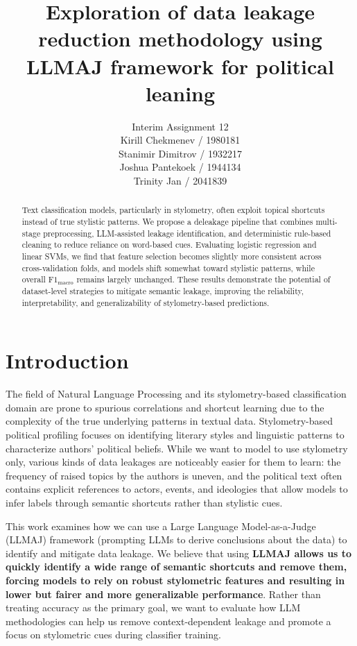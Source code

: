 \documentclass[11pt]{article}
\title{Exploration of data leakage reduction methodology using LLMAJ framework for political leaning}
\author{Interim Assignment 12 \\
  Kirill Chekmenev / 1980181 \\
  Stanimir Dimitrov / 1932217 \\
  Joshua Pantekoek / 1944134 \\
  Trinity Jan / 2041839 \\}
\begin{document}
\maketitle
\begin{abstract}
    Text classification models, particularly in stylometry, often exploit topical shortcuts instead of true stylistic patterns. We propose a deleakage pipeline that combines multi-stage preprocessing, LLM-assisted leakage identification, and deterministic rule-based cleaning to reduce reliance on word-based cues. Evaluating logistic regression and linear SVMs, we find that feature selection becomes slightly more consistent across cross-validation folds, and models shift somewhat toward stylistic patterns, while overall $\mathrm{F1}_{\text{macro}}$ remains largely unchanged. These results demonstrate the potential of dataset-level strategies to mitigate semantic leakage, improving the reliability, interpretability, and generalizability of stylometry-based predictions.
\end{abstract}

\section{Introduction}
The field of Natural Language Processing and its stylometry-based classification domain are prone to spurious correlations and shortcut learning due to the complexity of the true underlying patterns in textual data. Stylometry-based political profiling focuses on identifying literary styles and linguistic patterns to characterize authors’ political beliefs. While we want to model to use stylometry only, various kinds of data leakages are noticeably easier for them to learn: the frequency of raised topics by the authors is uneven, and the political text often contains explicit references to actors, events, and ideologies that allow models to infer labels through semantic shortcuts rather than stylistic cues.


This work examines how we can use a Large Language Model-as-a-Judge (LLMAJ) framework (prompting LLMs to derive conclusions about the data) to identify and mitigate data leakage. We believe that using \textbf{LLMAJ allows us to quickly identify a wide range of semantic shortcuts and remove them, forcing models to rely on robust stylometric features and resulting in lower but fairer and more generalizable performance}. Rather than treating accuracy as the primary goal, we want to evaluate how LLM methodologies can help us remove context-dependent leakage and promote a focus on stylometric cues during classifier training.
\end{document}
